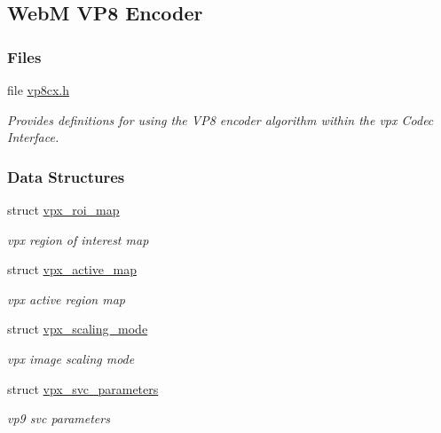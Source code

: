 \hypertarget{group__vp8__encoder}{\subsection{Web\+M V\+P8 Encoder}
\label{group__vp8__encoder}
}
\subsubsection*{Files}
\begin{DoxyCompactItemize}
\item 
file \hyperlink{vp8cx_8h}{vp8cx.\+h}
\begin{DoxyCompactList}\small\item\em Provides definitions for using the V\+P8 encoder algorithm within the vpx Codec Interface. \end{DoxyCompactList}\end{DoxyCompactItemize}
\subsubsection*{Data Structures}
\begin{DoxyCompactItemize}
\item 
struct \hyperlink{structvpx__roi__map}{vpx\+\_\+roi\+\_\+map}
\begin{DoxyCompactList}\small\item\em vpx region of interest map \end{DoxyCompactList}\item 
struct \hyperlink{structvpx__active__map}{vpx\+\_\+active\+\_\+map}
\begin{DoxyCompactList}\small\item\em vpx active region map \end{DoxyCompactList}\item 
struct \hyperlink{structvpx__scaling__mode}{vpx\+\_\+scaling\+\_\+mode}
\begin{DoxyCompactList}\small\item\em vpx image scaling mode \end{DoxyCompactList}\item 
struct \hyperlink{structvpx__svc__parameters}{vpx\+\_\+svc\+\_\+parameters}
\begin{DoxyCompactList}\small\item\em vp9 svc parameters \end{DoxyCompactList}\end{DoxyCompactItemize}
